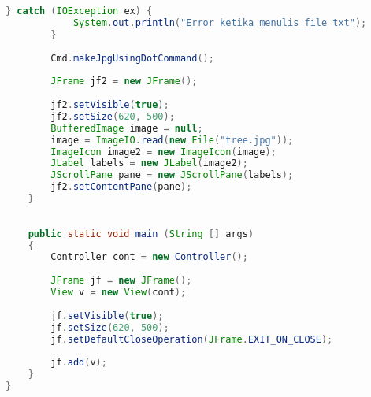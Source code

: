 \begin{lstlisting}[language=Java,basicstyle=\tiny,caption=Controller.java]
        } catch (IOException ex) {
            System.out.println("Error ketika menulis file txt");
        }
        
        Cmd.makeJpgUsingDotCommand();
        
        JFrame jf2 = new JFrame();
        
        jf2.setVisible(true);
        jf2.setSize(620, 500);
        BufferedImage image = null;
        image = ImageIO.read(new File("tree.jpg"));
        ImageIcon image2 = new ImageIcon(image);
        JLabel labels = new JLabel(image2);
        JScrollPane pane = new JScrollPane(labels);
        jf2.setContentPane(pane);
    }
    
    
    public static void main (String [] args) 
    {
        Controller cont = new Controller();
        
        JFrame jf = new JFrame();
        View v = new View(cont);
        
        jf.setVisible(true);
        jf.setSize(620, 500);
        jf.setDefaultCloseOperation(JFrame.EXIT_ON_CLOSE);
        
        jf.add(v);
    }
}

\end{lstlisting}


